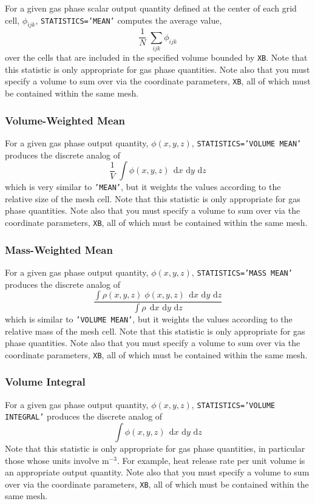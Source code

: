 \documentclass[11pt]{book}
\newcommand{\ct}{\tt\small}
\renewcommand{\d}{\,\mathrm{d}}
\newcommand{\be}{\begin{equation}}
\newcommand{\ee}{\end{equation}}
\begin{document}
For a given gas phase scalar output quantity defined at the center of each grid cell, $\phi_{ijk}$, {\ct STATISTICS='MEAN'} computes the average value,
\be \frac{1}{N} \; \sum_{ijk} \phi_{ijk}  \ee
over the cells that are included in the specified volume bounded by {\ct XB}. Note that this
statistic is only appropriate for gas phase quantities. Note also that you must specify a volume to sum over via the
coordinate parameters, {\ct XB}, all of which must be contained within the same mesh.

\subsubsection{Volume-Weighted Mean}

For a given gas phase output quantity, $\phi(x,y,z)$, {\ct STATISTICS='VOLUME MEAN'} produces the discrete analog of
\be \frac{1}{V} \; \int \phi(x,y,z) \; \d x \, \d y \, \d z \ee
which is very similar to {\ct 'MEAN'}, but it weights the values according to the relative size of the mesh cell. Note that this
statistic is only appropriate for gas phase quantities. Note also that you must specify a volume to sum over via the
coordinate parameters, {\ct XB}, all of which must be contained within the same mesh.

\subsubsection{Mass-Weighted Mean}

For a given gas phase output quantity, $\phi(x,y,z)$, {\ct STATISTICS='MASS MEAN'} produces the discrete analog of
\be \frac{ \int \rho(x,y,z) \; \phi(x,y,z) \; \d x \, \d y \, \d z}{\int \rho \; \d x \, \d y \, \d z}  \ee
which is similar to {\ct 'VOLUME MEAN'}, but it weights the values according to the relative mass of the mesh cell. Note that this
statistic is only appropriate for gas phase quantities. Note also that you must specify a volume to sum over via the
coordinate parameters, {\ct XB}, all of which must be contained within the same mesh.

\subsubsection{Volume Integral}

For a given gas phase output quantity, $\phi(x,y,z)$, {\ct STATISTICS='VOLUME INTEGRAL'} produces the discrete analog of
\be \int \phi(x,y,z) \; \d x \, \d y \, \d z \ee
Note that this statistic is only appropriate for gas phase quantities, in particular those whose units involve m$^{-3}$. For example,
heat release rate per unit volume is an appropriate output quantity. Note also that you must specify a volume to sum over via the
coordinate parameters, {\ct XB}, all of which must be contained within the same mesh.
\end{document}
